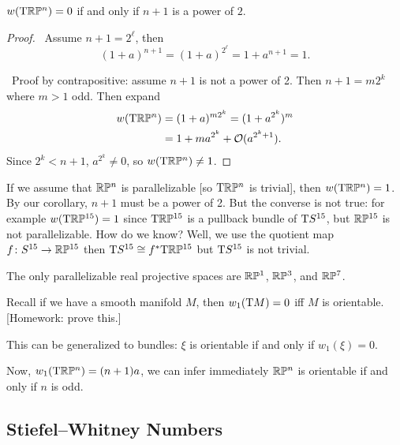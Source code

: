 \begin{corollary}[Stiefel]
$w(\mathrm{T}\mathbb{R}\mathbb{P}^{n})=0$ if and only if $n+1$ is a power of $2$.
\end{corollary}

\begin{proof}
\backwardproof\ Assume $n+1=2^{\ell}$, then
\begin{equation}
(1+a)^{n+1}=(1+a)^{2^{\ell}}=1+a^{n+1}=1.
\end{equation}

\forwardproof\ Proof by contrapositive: assume $n+1$ is not a power of
2. Then $n+1=m2^{k}$ where $m>1$ odd. Then expand
\begin{subequations}
  \begin{align}
w(\mathrm{T}\mathbb{R}\mathbb{P}^{n}) &= (1+a)^{m2^{k}}=(1+a^{2^{k}})^{m}\\
&=1+ma^{2^{k}} + \mathcal{O}(a^{2^{k}+1}).
  \end{align}
\end{subequations}
Since $2^{k}<n+1$, $a^{2^{k}}\neq0$, so $w(\mathrm{T}\mathbb{R}\mathbb{P}^{n})\neq1$.
\end{proof}

\begin{remark}
If we assume that $\mathbb{R}\mathbb{P}^{n}$ is parallelizable [so $\mathrm{T}\mathbb{R}\mathbb{P}^{n}$ is
  trivial], then $w(\mathrm{T}\mathbb{R}\mathbb{P}^{n})=1$. By our corollary, $n+1$ must be a
power of 2. But the converse is not true: for example
$w(\mathrm{T}\mathbb{R}\mathbb{P}^{15})=1$ since $\mathrm{T}\mathbb{R}\mathbb{P}^{15}$ is a pullback bundle of
$\mathrm{T}S^{15}$, but $\mathbb{R}\mathbb{P}^{15}$ is 
not parallelizable. How do we know? Well, we use the quotient map $f\colon S^{15}\to\mathbb{R}\mathbb{P}^{15}$
then $\mathrm{T}S^{15}\cong f^{*}\mathrm{T}\mathbb{R}\mathbb{P}^{15}$ but $\mathrm{T}S^{15}$ is not
trivial.

The only parallelizable real projective spaces are $\mathbb{R}\mathbb{P}^{1}$,
$\mathbb{R}\mathbb{P}^{3}$, and $\mathbb{R}\mathbb{P}^{7}$.
\end{remark}

\begin{remark}
Recall if we have a smooth manifold $M$, then $w_{1}(\mathrm{T} M)=0$ iff $M$
is orientable. [Homework: prove this.]

This can be generalized to bundles: $\xi$ is orientable if and only if
$w_{1}(\xi)=0$.

Now, $w_{1}(\mathrm{T}\mathbb{R}\mathbb{P}^{n})=(n+1)a$, we can infer immediately $\mathbb{R}\mathbb{P}^{n}$ is
orientable if and only if $n$ is odd.
\end{remark}

\subsection{Stiefel--Whitney Numbers}


